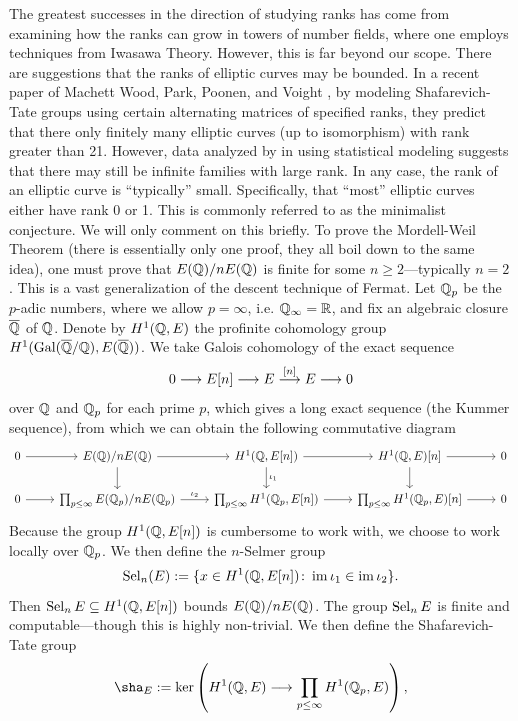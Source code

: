 The greatest successes in the direction of studying ranks has come from examining how the ranks can grow in towers of number fields, where one employs techniques from Iwasawa Theory. However, this is far beyond our scope. There are suggestions that the ranks of elliptic curves may be bounded. In a recent paper of Machett Wood, Park, Poonen, and Voight \cite{parkpoonenvoightwood19}, by modeling Shafarevich-Tate groups using certain alternating matrices of specified ranks, they predict that there only finitely many elliptic curves (up to isomorphism) with rank greater than 21. However, data analyzed by \lozrob{} in \cite{lozanorobledo21} using statistical modeling suggests that there may still be infinite families with large rank. In any case, the rank of an elliptic curve is ``typically'' small. Specifically, that ``most'' elliptic curves either have rank 0 or 1. This is commonly referred to as the minimalist conjecture. We will only comment on this briefly. To prove the Mordell-Weil Theorem (there is essentially only one proof, they all boil down to the same idea), one must prove that $E(\mathbb{Q})/nE(\mathbb{Q})$ is finite for some $n \geq 2$---typically $n= 2$. This is a vast generalization of the descent technique of Fermat. Let $\mathbb{Q}_p$ be the $p$-adic numbers, where we allow $p= \infty$, i.e. $\mathbb{Q}_\infty= \mathbb{R}$, and fix an algebraic closure $\overline{\mathbb{Q}}$ of $\mathbb{Q}$. Denote by $H^1(\mathbb{Q}, E)$ the profinite cohomology group $H^1(\operatorname{Gal}(\overline{\mathbb{Q}}/\mathbb{Q}), E(\overline{\mathbb{Q}}))$. We take Galois cohomology of the exact sequence
	\[
	0 \stackrel{}{\longrightarrow} E[n] \stackrel{}{\longrightarrow} E \stackrel{[n]}{\longrightarrow} E \stackrel{}{\longrightarrow} 0
	\]
over $\mathbb{Q}$ and $\mathbb{Q}_p$ for each prime $p$, which gives a long exact sequence (the Kummer sequence), from which we can obtain the following commutative diagram
	\[
	\begin{tikzcd}
	0 \arrow{r} & E(\Q)/nE(\Q) \arrow{r} \arrow{d} & H^1(\Q, E[n]) \arrow{d}{\iota_1} \arrow{r} & H^1(\Q,E)[n] \arrow{d} \arrow{r} & 0 \\
	0 \arrow{r} & \prod_{p \leq \infty} E(\Q_p)/nE(\Q_p) \arrow{r}{\iota_2} & \prod_{p \leq \infty} H^1(\Q_p, E[n]) \arrow{r} & \prod_{p \leq \infty} H^1(\Q_p,E)[n] \arrow{r} & 0 
	\end{tikzcd}
	\]
Because the group $H^1(\mathbb{Q}, E[n])$ is cumbersome to work with, we choose to work locally over $\mathbb{Q}_p$. We then define the $n$-Selmer group
	\[
	\operatorname{Sel}_n(E):= \{ x \in H^1(\mathbb{Q}, E[n]) \colon \operatorname{im} \iota_1 \in \operatorname{im} \iota_2 \}.
	\]
Then $\operatorname{Sel}_n E \subseteq H^1(\mathbb{Q}, E[n])$ bounds $E(\mathbb{Q})/nE(\mathbb{Q})$. The group $\operatorname{Sel}_n E$ is finite and computable---though this is highly non-trivial. We then define the Shafarevich-Tate group
	\[
	\sha_E:= \ker \left( H^1(\Q, E) \ma{} \prod_{p \leq \infty} H^1(\Q_p, E) \right),
	\]
